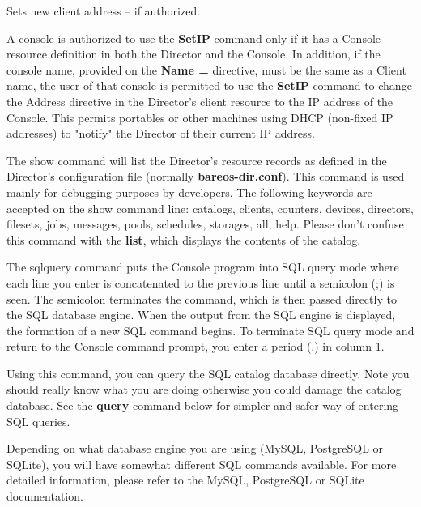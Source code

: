 \begin{description}
{\item [setip]
   Sets new client address -- if authorized.

   A console is authorized to use the {\bf SetIP} command only if it has a
   Console resource definition in both the Director and the Console.  In
   addition, if the console name, provided on the {\bf Name =} directive,
   must be the same as a Client name, the user of that console is permitted
   to use the {\bf SetIP} command to change the Address directive in the
   Director's client resource to the IP address of the Console.  This
   permits portables or other machines using DHCP (non-fixed IP addresses)
   to "notify" the Director of their current IP address.

\item [show]
   The show command will list the Director's resource records as defined in
   the Director's configuration file (normally {\bf bareos-dir.conf}).
   This command is used mainly for debugging purposes by developers.
   The following keywords are accepted on the
   show command line: catalogs, clients, counters, devices, directors,
   filesets, jobs, messages, pools, schedules, storages, all, help.
   Please don't confuse this command
   with the {\bf list}, which displays the contents of the catalog.

\item [sqlquery]
   The sqlquery command puts the Console program into SQL query mode where
   each line you enter is concatenated to the previous line until a
   semicolon (;) is seen.  The semicolon terminates the command, which is
   then passed directly to the SQL database engine.  When the output from
   the SQL engine is displayed, the formation of a new SQL command begins.
   To terminate SQL query mode and return to the Console command prompt,
   you enter a period (.) in column 1.

   Using this command, you can query the SQL catalog database directly.
   Note you should really know what you are doing otherwise you could
   damage the catalog database.  See the {\bf query} command below for
   simpler and safer way of entering SQL queries.

   Depending on what database engine you are using (MySQL, PostgreSQL or
   SQLite), you will have somewhat different SQL commands available.  For
   more detailed information, please refer to the MySQL, PostgreSQL or
   SQLite documentation.

}
\end{description}
